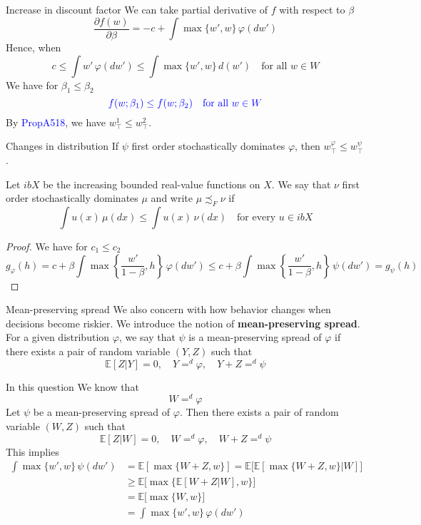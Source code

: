 \begin{frame}{Increase in discount factor}
We can take partial derivative of $f$ with respect to $\beta$
$$
\frac{\partial f(w)}{\partial \beta} = -c+\int\max\{w',w\}\,\varphi(dw')
$$
Hence, when 
$$
c\le \int w'\,\varphi(dw') \le \int\max\{w',w\}\,d(w')\quad \text{for all $w\in W$}
$$
We have for $\beta_1\le\beta_2$
$$
\textcolor{blue}{f(w;\beta_1)\le f(w;\beta_2)\quad \text{for all $w\in W$}}
$$
By \textcolor{blue}{PropA518}, we have $w_\top^1\le w_\top^2$.
\end{frame}



\begin{frame}{Changes in distribution}
If $\psi$ first order stochastically dominates $\varphi$, then $w_\top^\varphi\le w_\top^\psi$.
\begin{definition}
    Let $ibX$ be the increasing bounded real-value functions on $X$. We say that $\nu$ first order stochastically dominates $\mu$ and write $\mu\precsim_F \nu$ if 
    $$
    \int u(x)\,\mu(dx)\le \int u(x)\,\nu(dx)\quad\text{for every $u\in ibX$}
    $$
\end{definition}
\begin{proof}
     We have for $c_1\le c_2$
    $$
    g_\varphi(h) = c + \beta \int \max\left\{\frac{w'}{1-\beta}, h\right\}\,\varphi(dw')\le c+ \beta \int \max\left\{\frac{w'}{1-\beta}, h\right\}\,\psi(dw') = g_\psi(h)
    $$
\end{proof}
    
\end{frame}


\begin{frame}{Mean-preserving spread}
    We also concern with how behavior changes when decisions become riskier. We introduce the notion of \textbf{mean-preserving spread}. For a given distribution $\varphi$, we say that $\psi$ is a mean-preserving spread of $\varphi$ if there exists a pair of random variable $(Y,Z)$ such that
    $$
    \mathbb{E}[Z|Y] = 0,\quad Y=^d \varphi, \quad Y+Z=^d\psi 
    $$
\end{frame}

\begin{frame}{In this question}
We know that
$$
W =^d \varphi
$$
Let $\psi$ be a mean-preserving spread of $\varphi$. Then there exists a pair of random variable $(W,Z)$ such that
$$
\mathbb{E}[Z|W] = 0,\quad W=^d\varphi, \quad W+Z=^d\psi
$$
This implies
\begin{align*}
    \int\max\{w',w\}\,\psi(dw') &= \mathbb{E}[\max\{W+Z, w\}]= \mathbb{E}\bigg[\mathbb{E}[\max\{W+Z, w\}|W]\bigg]\tag{LIE}\\
    &\ge \mathbb{E}\bigg[\max\{\mathbb{E}[W+Z|W],w\}\bigg]\tag{Cond. Jensen}\\
    &= \mathbb{E}\bigg[\max\{W,w\}\bigg]\tag{Linearity}\\
    &= \int\max\{w',w\}\,\varphi(dw')
\end{align*}
\end{frame}